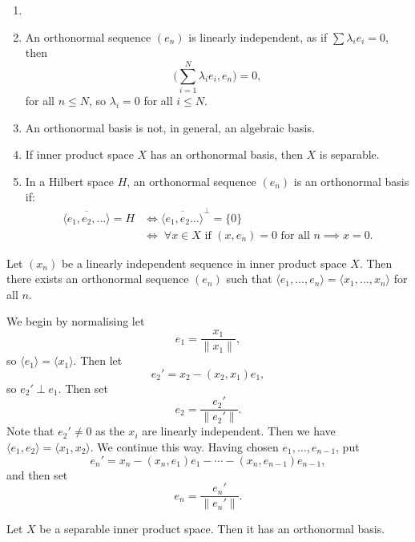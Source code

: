 \documentclass[12pt]{article}
\begin{document}
\begin{remark}
	\begin{enumerate}
		\item[]
		\item An orthonormal sequence $(e_n)$ is linearly independent, as if $\sum \lambda_i e_i = 0$, then
			\[
			\Biggl( \sum_{i = 1}^{N} \lambda_i e_i, e_n \Biggr) = 0,
			\]
			for all $n \leq N$, so $\lambda_i = 0$ for all $i \leq N$.
		\item An orthonormal basis is not, in general, an algebraic basis.
		\item If inner product space $X$ has an orthonormal basis, then $X$ is separable.
		\item In a Hilbert space $H$, an orthonormal sequence $(e_n)$ is an orthonormal basis if:
			\begin{align*}
				\overline{\langle e_1, e_2, \ldots \rangle} = H & \iff \overline{\langle e_1, e_2 \ldots \rangle}^{\perp} = \{0\} \\
									    &\iff \; \forall x \in X \text{ if } (x, e_n) = 0 \text{ for all } n \implies x = 0.
			\end{align*}
	\end{enumerate}
\end{remark}

\begin{theorem}
	Let $(x_n)$ be a linearly independent sequence in inner product space $X$. Then there exists an orthonormal sequence $(e_n)$ such that $\langle e_1, \ldots, e_n \rangle = \langle x_1, \ldots, x_n \rangle$ for all $n$.
\end{theorem}

\begin{proofbox}
	We begin by normalising let
	\[
	e_1 = \frac{x_1}{\|x_1\|},
	\]
	so $\langle e_1 \rangle = \langle x_1 \rangle$. Then let
	\[
	e_2' = x_2 - (x_2, x_1) e_1,
	\]
	so $e_2' \perp e_1$. Then set
	\[
	e_2 = \frac{e_2'}{\|e_2'\|}.
	\]
	Note that $e_2' \neq 0$ as the $x_i$ are linearly independent. Then we have $\langle e_1, e_2 \rangle = \langle x_1, x_2 \rangle$. We continue this way. Having chosen $e_1, \ldots, e_{n-1}$, put
	\[
	e_n' = x_n - (x_n, e_1) e_1 - \cdots - (x_n, e_{n-1}) e_{n-1},
	\]
	and then set
	\[
	e_n = \frac{e_n'}{\|e_n'\|}.
	\]
\end{proofbox}

\begin{corollary}
	Let $X$ be a separable inner product space. Then it has an orthonormal basis.
\end{corollary}
\end{document}
